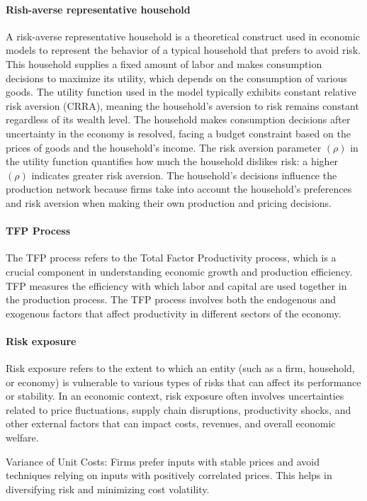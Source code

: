 \documentclass[11pt]{article}
\theoremstyle{definition}
\begin{document}
	\paragraph{Rish-averse representative household} A risk-averse representative household is a theoretical construct used in economic models to represent the behavior of a typical household that prefers to avoid risk. This household supplies a fixed amount of labor and makes consumption decisions to maximize its utility, which depends on the consumption of various goods. The utility function used in the model typically exhibits constant relative risk aversion (CRRA), meaning the household's aversion to risk remains constant regardless of its wealth level. The household makes consumption decisions after uncertainty in the economy is resolved, facing a budget constraint based on the prices of goods and the household’s income. The risk aversion parameter $(\rho)$ in the utility function quantifies how much the household dislikes risk: a higher $(\rho)$ indicates greater risk aversion. The household's decisions influence the production network because firms take into account the household's preferences and risk aversion when making their own production and pricing decisions.
	
	\paragraph{TFP Process} The TFP process refers to the Total Factor Productivity process, which is a crucial component in understanding economic growth and production efficiency. TFP measures the efficiency with which labor and capital are used together in the production process. The TFP process involves both the endogenous and exogenous factors that affect productivity in different sectors of the economy.
	
	\paragraph{Risk exposure} Risk exposure refers to the extent to which an entity (such as a firm, household, or economy) is vulnerable to various types of risks that can affect its performance or stability. In an economic context, risk exposure often involves uncertainties related to price fluctuations, supply chain disruptions, productivity shocks, and other external factors that can impact costs, revenues, and overall economic welfare.
	
	Variance of Unit Costs: Firms prefer inputs with stable prices and avoid techniques relying on inputs with positively correlated prices. This helps in diversifying risk and minimizing cost volatility.
	
\end{document}
